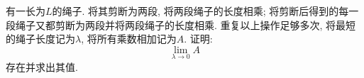 \documentclass{article}
\begin{document}
有一长为$L$的绳子. 将其剪断为两段, 将两段绳子的长度相乘; 将剪断后得到的每一段绳子又都剪断为两段并将两段绳子的长度相乘. 重复以上操作足够多次, 将最短的绳子长度记为$\lambda$, 将所有乘数相加记为$A$. 证明:
$$\lim_{\lambda \to 0}A$$
存在并求出其值.
\end{document}
